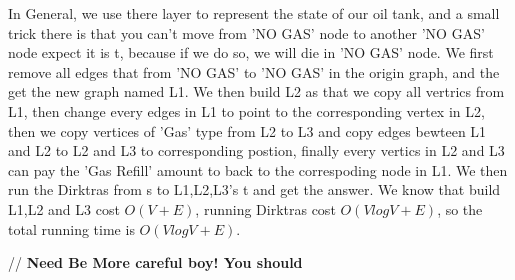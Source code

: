 \documentclass[12pt,twoside]{article}
\begin{document}
In General, we use there layer to represent the state of our oil tank, and a small trick there is that you can't move from 'NO GAS' node to another 'NO GAS' node expect it is t, because if we do so, we will die in 'NO GAS' node. 
We first remove all edges that from 'NO GAS' to 'NO GAS' in the origin graph, and the get the new graph named L1. We then build L2 as that we copy all vertrics from L1, then change every edges in L1 to point to the corresponding vertex in L2, then we copy vertices of 'Gas' type from L2 to L3 and copy edges bewteen L1 and L2 to L2 and L3 to corresponding postion, finally every vertics in L2 and L3 can pay the 'Gas Refill' amount to back to the correspoding node in L1. We then run the Dirktras from s to L1,L2,L3's t and get the answer. We know that build L1,L2 and L3 cost $O(V+E)$, running Dirktras cost $O(VlogV+E)$, so the total running time is $O(VlogV+E)$.

// \textbf{Need Be More careful boy! You should }
\end{document}
